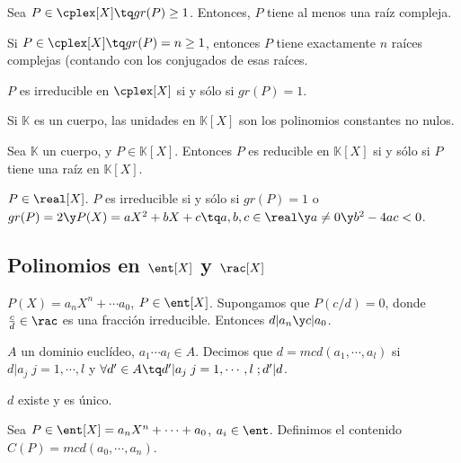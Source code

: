 \documentclass[nochap]{apuntes}
\begin{document}
\begin{theorem}
Sea $P\in \cplex [X] \tq gr(P) \geq 1$. Entonces, $P$ tiene al menos una raíz compleja.
\end{theorem}

\begin{corol} Si $P \in \cplex [X] \tq gr(P) = n \geq 1$, entonces $P$ tiene exactamente $n$ raíces complejas (contando con los conjugados de esas raíces. 

$P$ es irreducible en $\cplex [X]$ si y sólo si $gr(P) = 1$.
\end{corol}

\begin{lemma} Si $\mathbb{K}$ es un cuerpo, las unidades en $\mathbb{K}[X]$ son los polinomios constantes no nulos.\end{lemma}

\begin{theorem}
Sea $\mathbb{K}$ un cuerpo, y $P\in \mathbb{K} [X]$. Entonces $P$ es reducible en $\mathbb{K}[X]$ si y sólo si $P$ tiene una raíz en $\mathbb{K} [X]$.
\end{theorem}

\begin{theorem}
$P \in \real [X]$. $P$ es irreducible si y sólo si $gr(P) = 1$ o $gr(P) = 2 \y P(X) = aX^2+bX+c \tq a,b,c\in \real \y a \neq 0 \y b^2 -4ac < 0$.
\end{theorem}

\subsection{Polinomios en $\ent [X]$ y $\rac [X]$}

\begin{prop}$P(X) = a_n X^n +\cdots a_0$, $P \in \ent [X]$. Supongamos que $P(c/d) = 0$, donde $\frac{c}{d} \in \rac$ es una fracción irreducible. Entonces $d|a_n \y c|a_0$.\end{prop}

\begin{defn}$A$ un dominio euclídeo, $a_1\cdots a_l \in A$. Decimos que $d=mcd(a_1,\cdots,a_l)$ si $d|a_j\; j=1,\cdots, l$ y $ \forall d'\in A \tq d'|a_j\; j=1,\cdots, l \; ; d'|d$.

$d$ existe y es único.\end{defn}

\begin{defn}[Contenido] Sea $P \in \ent [X] = a_nX^n +\cdots + a_0$, $a_i \in \ent$. Definimos el contenido $C(P) = mcd (a_0,\cdots,a_n)$.\end{defn}
\end{document}
